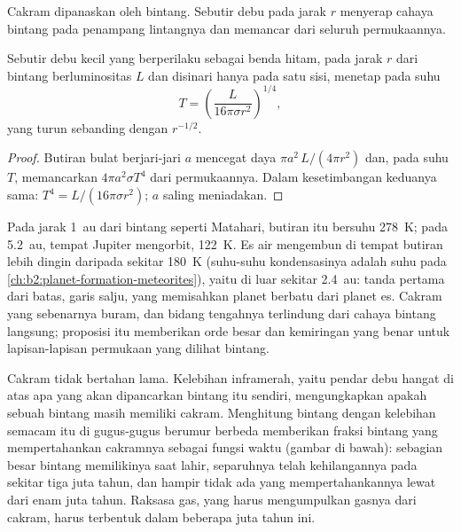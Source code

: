 Cakram dipanaskan oleh bintang. Sebutir debu pada jarak $r$ menyerap cahaya bintang
pada penampang lintangnya dan memancar dari seluruh permukaannya.

\begin{proposition}
\label{prop:b2:ism-star-formation:grain}
Sebutir debu kecil yang berperilaku sebagai benda hitam, pada jarak $r$ dari bintang
berluminositas $L$ dan disinari hanya pada satu sisi, menetap pada suhu
\[
  T = \left(\frac{L}{16\pi\sigma r^2}\right)^{1/4},
\]
yang turun sebanding dengan $r^{-1/2}$.
\end{proposition}

\begin{proof}
Butiran bulat berjari-jari $a$ mencegat daya $\pi a^2\,L/(4\pi r^2)$
dan, pada suhu $T$, memancarkan $4\pi a^2\sigma T^4$ dari permukaannya.
Dalam kesetimbangan keduanya sama: $T^4 = L/(16\pi\sigma r^2)$; $a$ saling meniadakan.
\end{proof}

Pada jarak \qty{1}{au} dari bintang seperti Matahari, butiran itu bersuhu \qty{278}{K}; pada
\qty{5.2}{au}, tempat Jupiter mengorbit, \qty{122}{K}. Es air mengembun di tempat
butiran lebih dingin daripada sekitar \qty{180}{K} (suhu-suhu kondensasinya adalah
suhu pada \cref{ch:b2:planet-formation-meteorites}), yaitu di luar sekitar
\qty{2.4}{au}: tanda pertama dari batas, garis salju, yang memisahkan
planet berbatu dari planet es. Cakram yang sebenarnya buram, dan bidang tengahnya terlindung dari cahaya bintang langsung;
proposisi itu memberikan orde besar dan kemiringan yang benar untuk
lapisan-lapisan permukaan yang dilihat bintang.

Cakram tidak bertahan lama. Kelebihan inframerah, yaitu pendar debu hangat di atas apa yang
akan dipancarkan bintang itu sendiri, mengungkapkan apakah sebuah bintang masih memiliki
cakram. Menghitung bintang dengan kelebihan semacam itu di gugus-gugus berumur berbeda
memberikan fraksi bintang yang mempertahankan cakramnya sebagai fungsi waktu (gambar di
bawah): sebagian besar bintang memilikinya saat lahir, separuhnya telah kehilangannya pada
sekitar tiga juta tahun, dan hampir tidak ada yang mempertahankannya lewat dari enam juta tahun. Raksasa gas, yang harus
mengumpulkan gasnya dari cakram, harus terbentuk dalam beberapa juta tahun ini.

